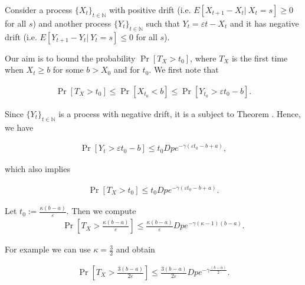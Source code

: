 \documentclass[12pt, a4paper]{article}
\theoremstyle{remark}
\begin{document}
Consider a process $\{X_t\}_{t \in \mathbb{N}}$ with positive drift (i.e. $E[X_{t + 1} - X_t |\ X_t = s] \geq 0$ for all $s$) and another process $\{Y_t\}_{t \in \mathbb{N}}$ such that $Y_t = \varepsilon t - X_t$ and it has negative drift (i.e. $E[Y_{t + 1} - Y_t |\ Y_t = s] \leq 0$ for all $s$).

Our aim is to bound the probability $\Pr[T_X > t_0]$, where $T_X$ is the first time when $X_t \geq b$ for some $b > X_0$ and for $t_0$. We first note that

\begin{align*}
    \Pr[T_X > t_0] \leq \Pr[X_{t_0} < b] \leq \Pr[Y_{t_0} > \varepsilon t_0 - b].
\end{align*}

Since $\{Y_t\}_{t \in \mathbb{N}}$ is a process with negative drift, it is a subject to Theorem \cite{}. Hence, we have

\begin{align*}
    \Pr[Y_t > \varepsilon t_0 - b] \leq t_0 D p e^{-\gamma(\varepsilon t_0 - b + a)},
\end{align*}

which also implies

\begin{align*}
    \Pr[T_X > t_0] \leq t_0 D p e^{-\gamma(\varepsilon t_0 - b + a)}.
\end{align*}

Let $t_0 := \frac{\kappa (b - a)}{\varepsilon}$. Then we compute
\begin{align*}
    \Pr\left[T_X > \frac{\kappa (b - a)}{\varepsilon}\right] \leq \frac{\kappa (b - a)}{\varepsilon} D p e^{-\gamma(\kappa - 1)(b - a)}.
\end{align*}

For example we can use $\kappa = \frac{3}{2}$ and obtain

\begin{align*}
    \Pr\left[T_X > \frac{3 (b - a)}{2\varepsilon}\right] \leq \frac{3(b - a)}{2\varepsilon} D p e^{-\gamma\frac{(b - a)}{2}}.
\end{align*}



\end{document}
